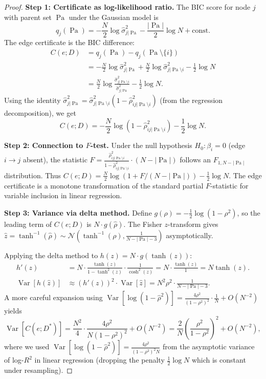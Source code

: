\documentclass{article}
\theoremstyle{definition}
\theoremstyle{plain}
\theoremstyle{remark}
\DeclareMathOperator{\Pa}{Pa}
\DeclareMathOperator{\Var}{Var}
\begin{document}
\begin{proof}
\textbf{Step 1: Certificate as log-likelihood ratio.}
The BIC score for node $j$ with parent set $\Pa$ under the Gaussian model is
$$q_j(\Pa) = -\frac{N}{2}\log\hat{\sigma}^2_{j|\Pa}
  - \frac{|\Pa|}{2}\log N + \text{const}.$$
The edge certificate is the BIC difference:
\begin{align}
  C(e; D)
  &= q_j(\Pa) - q_j(\Pa \setminus \{i\}) \\
  &= -\frac{N}{2}\log\hat{\sigma}^2_{j|\Pa}
    + \frac{N}{2}\log\hat{\sigma}^2_{j|\Pa\setminus i}
    - \frac{1}{2}\log N \\
  &= \frac{N}{2}\log\frac{\hat{\sigma}^2_{j|\Pa\setminus i}}
    {\hat{\sigma}^2_{j|\Pa}} - \frac{1}{2}\log N.
\end{align}
Using the identity
$\hat{\sigma}^2_{j|\Pa} = \hat{\sigma}^2_{j|\Pa\setminus i}(1 - \hat{\rho}^2_{ij|\Pa\setminus i})$
(from the regression decomposition), we get
$$C(e; D) = -\frac{N}{2}\log(1 - \hat{\rho}^2_{ij|\Pa\setminus i})
  - \frac{1}{2}\log N.$$

\textbf{Step 2: Connection to $F$-test.}
Under the null hypothesis $H_0: \beta_i = 0$ (edge $i \to j$ absent), the
statistic $F = \frac{\hat{\rho}^2_{ij|\Pa\setminus i}}{1 - \hat{\rho}^2_{ij|\Pa\setminus i}}
\cdot (N - |\Pa|)$ follows an $F_{1, N-|\Pa|}$ distribution. Thus
$C(e; D) = \frac{N}{2}\log(1 + F/(N - |\Pa|)) - \frac{1}{2}\log N$.
The edge certificate is a monotone transformation of the standard partial
$F$-statistic for variable inclusion in linear regression.

\textbf{Step 3: Variance via delta method.}
Define $g(\rho) = -\frac{1}{2}\log(1 - \rho^2)$, so the leading term of
$C(e; D)$ is $N \cdot g(\hat{\rho})$. The Fisher $z$-transform gives
$\hat{z} = \tanh^{-1}(\hat{\rho}) \sim \mathcal{N}(\tanh^{-1}(\rho),
\frac{1}{N - |\Pa| - 3})$ asymptotically.

Applying the delta method to $h(z) = N \cdot g(\tanh(z))$:
\begin{align}
  h'(z) &= N \cdot \frac{\tanh(z)}{1 - \tanh^2(z)} \cdot \frac{1}{\cosh^2(z)}
         = N \cdot \frac{\tanh(z)}{1} = N\tanh(z). \\
  \Var[h(\hat{z})] &\approx (h'(z))^2 \cdot \Var[\hat{z}]
   = N^2 \rho^2 \cdot \frac{1}{N - |\Pa| - 3}.
\end{align}
A more careful expansion using $\Var[\log(1 - \hat{\rho}^2)]
= \frac{4\rho^2}{(1-\rho^2)^2} \cdot \frac{1}{N} + O(N^{-2})$ yields
\begin{equation}
  \Var[C(e; D^*)] = \frac{N^2}{4} \cdot \frac{4\rho^2}{N(1-\rho^2)^2} + O(N^{-2})
  = \frac{2}{N}\!\left(\frac{\rho^2}{1-\rho^2}\right)^{\!2} + O(N^{-2}),
\end{equation}
where we used $\Var[\log(1 - \hat{\rho}^2)] = \frac{4\rho^2}{(1-\rho^2)^2 N}$
from the asymptotic variance of log-$R^2$ in linear regression
(dropping the penalty $\frac{1}{2}\log N$ which is constant under resampling).


\end{proof}
\end{document}
